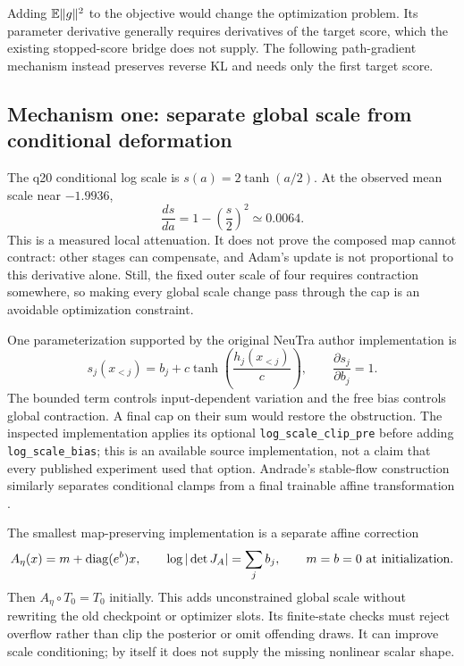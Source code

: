 Adding $\mathbb{E}\|g\|^2$ to the objective would change the optimization problem.
Its parameter derivative generally requires derivatives of the target score,
which the existing stopped-score bridge does not supply. The following
path-gradient mechanism instead preserves reverse KL and needs only the
first target score.

\subsection{Mechanism one: separate global scale from conditional deformation}

The q20 conditional log scale is $s(a)=2\tanh(a/2)$. At the observed mean
scale near $-1.9936$,
\begin{equation}
 \frac{ds}{da}=1-\left(\frac{s}{2}\right)^2\simeq0.0064.
\end{equation}
This is a measured local attenuation. It does not prove the composed map
cannot contract: other stages can compensate, and Adam's update is not
proportional to this derivative alone. Still, the fixed outer scale of four
requires contraction somewhere, so making every global scale change pass
through the cap is an avoidable optimization constraint.

One parameterization supported by the original NeuTra author implementation is
\begin{equation}
 s_j(x_{<j})=b_j+c\tanh\!\left(\frac{h_j(x_{<j})}{c}\right),
 \qquad \frac{\partial s_j}{\partial b_j}=1.
 \label{eq:bf-q20-free-scale}
\end{equation}
The bounded term controls input-dependent variation and the free bias controls
global contraction. A final cap on their sum would restore the obstruction.
The inspected  implementation applies its optional
\texttt{log\_scale\_clip\_pre} before adding \texttt{log\_scale\_bias};
this is an available source implementation, not a claim that every published
experiment used that option. Andrade's stable-flow construction similarly
separates conditional clamps from a final trainable affine transformation
\citep[Sections 3--5]{andrade2024stableflows}.

The smallest map-preserving implementation is a separate affine correction
\begin{equation}
 A_\eta(x)=m+\operatorname{diag}(e^b)x,\qquad
 \log|\det J_A|=\sum_j b_j,
 \qquad m=b=0\ \text{at initialization}.
 \label{eq:bf-q20-affine-mechanism}
\end{equation}
Then $A_\eta\circ T_0=T_0$ initially. This adds unconstrained global scale
without rewriting the old checkpoint or optimizer slots. Its finite-state
checks must reject overflow rather than clip the posterior or omit offending
draws. It can improve scale conditioning; by itself it does not supply the
missing nonlinear scalar shape.

